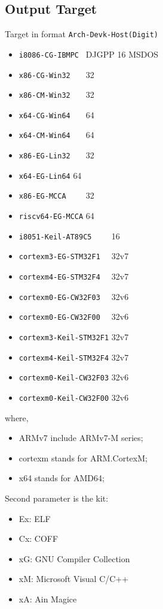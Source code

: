 
\subsection{Output Target}

Target in format \verb`Arch-Devk-Host(Digit)`
\begin{itemize}
\item \verb`i8086-CG-IBMPC ` {DJGPP 16 MSDOS}
\item \verb`x86-CG-Win32   ` {32}
\item \verb`x86-CM-Win32   ` {32}
\item \verb`x64-CG-Win64   ` {64}
\item \verb`x64-CM-Win64   ` {64}
\item \verb`x86-EG-Lin32   ` {32}
\item \verb`x64-EG-Lin64` {64}
\item \verb`x86-EG-MCCA    ` {32}
\item \verb`riscv64-EG-MCCA` {64}
\item \verb`i8051-Keil-AT89C5    ` {16}
\item \verb`cortexm3-EG-STM32F1  ` {32}v7
\item \verb`cortexm4-EG-STM32F4  ` {32}v7
\item \verb`cortexm0-EG-CW32F03  ` {32}v6
\item \verb`cortexm0-EG-CW32F00  ` {32}v6
\item \verb`cortexm3-Keil-STM32F1` {32}v7
\item \verb`cortexm4-Keil-STM32F4` {32}v7
\item \verb`cortexm0-Keil-CW32F03` {32}v6
\item \verb`cortexm0-Keil-CW32F00` {32}v6
\end{itemize}

where,
\begin{itemize}
\item ARMv7 include ARMv7-M series;
\item cortexm stands for ARM.CortexM;
\item x64 stands for AMD64;
\end{itemize}

Second parameter is the kit:
\begin{itemize}
\item Ex: ELF
\item Cx: COFF
\item xG: GNU Compiler Collection
\item xM: Microsoft Visual C/C++
\item xA: Ain Magice
\end{itemize}

